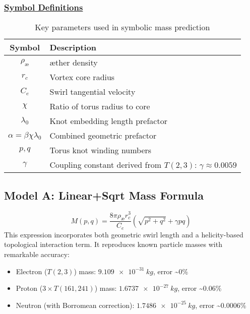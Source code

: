 \documentclass[11pt]{article}
\begin{document}
    \subsubsection*{\textbf{\underline{Symbol Definitions}}}
    \begin{table}[H]
        \centering
        \begin{tabular}{|c|l|}
            \hline
            \textbf{Symbol} & \textbf{Description} \\
            \hline
            \(\rho_{\text{\ae}}\) & æther density \\
            \(r_c\) & Vortex core radius \\
            \(C_e\) & Swirl tangential velocity \\
            \(\chi\) & Ratio of torus radius to core \\
            \(\lambda_0\) & Knot embedding length prefactor \\
            \(\alpha = \beta \chi \lambda_0\) & Combined geometric prefactor \\
            \(p, q\) & Torus knot winding numbers \\
            \(\gamma\) & Coupling constant derived from \(T(2,3)\): \(\gamma \approx 0.0059\) \\
            \hline
        \end{tabular}
        \caption{Key parameters used in symbolic mass prediction}
    \end{table}

    \subsection{Model A: Linear+Sqrt Mass Formula}
    \begin{equation}
        M(p,q) = \frac{8\pi \rho_{\text{\ae}} r_c^3}{C_e} \left( \sqrt{p^2 + q^2} + \gamma p q \right)
    \end{equation}
    This expression incorporates both geometric swirl length and a helicity-based topological interaction term. It reproduces known particle masses with remarkable accuracy:
    \begin{itemize}
        \item Electron (\( T(2,3) \)) mass: \( \SI{9.109e-31}{kg} \), error \textasciitilde{}0\%
        \item Proton (\( 3\times T(161,241) \)) mass: \( \SI{1.6737e-27}{kg} \), error \textasciitilde{}0.06\%
        \item Neutron (with Borromean correction): \( \SI{1.7486e-25}{kg} \), error \textasciitilde{}0.0006\%
    \end{itemize}
\end{document}
